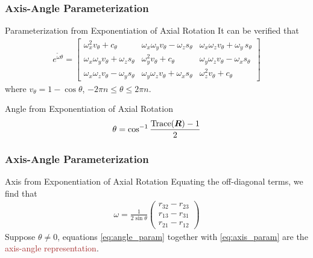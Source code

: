 \begin{frame}
	\frametitle{Axis-Angle Parameterization}
	\begin{block}{Parameterization from Exponentiation of Axial Rotation}
		It can be verified that 
		\begin{align}
			e^{ \tilde{\omega} \theta} = \begin{bmatrix}
				\omega_x^2 v_\theta + c_\theta  & \omega_x\omega_y v_\theta - \omega_z s_\theta & \omega_x \omega_z v_\theta + \omega_y \, s_\theta \\
				\omega_x \omega_y v_\theta + \omega_z s_\theta  & \omega_y^2 v_\theta+ c_\theta & \omega_y \omega_z v_\theta - \omega_x s_\theta \\
				\omega_x \omega_z v_\theta - \omega_y s_\theta  & \omega_y \omega_z v_\theta + \omega_x s_\theta & \omega_z^2 v_\theta + c_\theta
			\end{bmatrix} \nonumber
		\end{align}
		 where $ v_\theta = 1 - \cos \theta$, $-2\pi n \le \theta \le 2\pi n$.
	\end{block}
		\begin{block}{Angle from Exponentiation of Axial Rotation}
		\begin{align}
			 \theta = \cos^{-1}\dfrac{\text{Trace}(\bm{R})-1}{2}
			 \label{eq:angle_param}
		\end{align}
	\end{block}
\end{frame}

\begin{frame}
	\frametitle{Axis-Angle Parameterization}
	\begin{block}{Axis from Exponentiation of Axial Rotation}
		Equating the off-diagonal terms, we find that
		\begin{align}
			\omega = \frac{1}{2 \sin \theta} \left(
			\begin{array}{c}
				r_{32} - r_{23} \\
				r_{13} - r_{31} \\
				r_{21} - r_{12}
			\end{array} \right)
			\label{eq:axis_param}
		\end{align}
		 Suppose $\theta \neq 0$, equations \eqref{eq:angle_param} together with \eqref{eq:axis_param} are  the \textcolor{brown}{axis-angle representation}.
	\end{block}
\end{frame}


